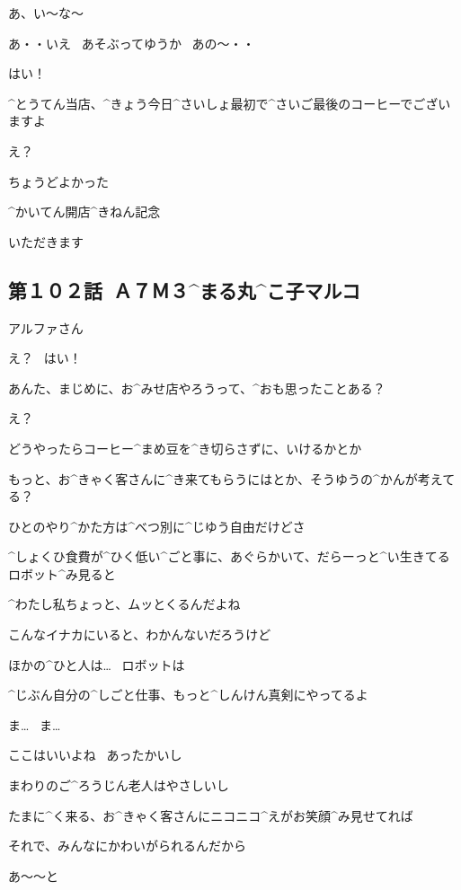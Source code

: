 \Alpha あ、い〜な〜

\Maruko あ・・いえ
\ あそぶってゆうか
\ あの〜・・

\page
\Alpha はい！

\Alpha ^{とうてん}{当店}、^{きょう}{今日}^{さいしょ}{最初}で^{さいご}{最後}のコーヒーでございますよ

\Kokone え？

\Alpha ちょうどよかった

\Alpha ^{かいてん}{開店}^{きねん}{記念}

\Kokone いただきます


\subsection{第１０２話\ Ａ７Ｍ３^{まる}{丸}^{こ}{子}マルコ}

\page[27]
\Maruko アルファさん

\Alpha え？
\ はい！

\page
\Maruko あんた、まじめに、お^{みせ}{店}やろうって、^{おも}{思}ったことある？

\Alpha え？

\Maruko どうやったらコーヒー^{まめ}{豆}を^{き}{切}らさずに、いけるかとか

\Maruko もっと、お^{きゃく}{客}さんに^{き}{来}てもらうにはとか、そうゆうの^{かんが}{考}えてる？

\page
\Maruko ひとのやり^{かた}{方}は^{べつ}{別}に^{じゆう}{自由}だけどさ

\Maruko ^{しょくひ}{食費}が^{ひく}{低}い^{ごと}{事}に、あぐらかいて、だらーっと^{い}{生}きてるロボット^{み}{見}ると

\Maruko ^{わたし}{私}ちょっと、ムッとくるんだよね

\Maruko こんなイナカにいると、わかんないだろうけど

\Maruko ほかの^{ひと}{人}は…
\ ロボットは

\Maruko ^{じぶん}{自分}の^{しごと}{仕事}、もっと^{しんけん}{真剣}にやってるよ

\Kokone ま…
\ ま…

\page
\Maruko ここはいいよね
\ あったかいし

\Maruko まわりのご^{ろうじん}{老人}はやさしいし

\Maruko たまに^{く}{来}る、お^{きゃく}{客}さんにニコニコ^{えがお}{笑顔}^{み}{見}せてれば

\Maruko それで、みんなにかわいがられるんだから

\page
\Alpha あ〜〜と

